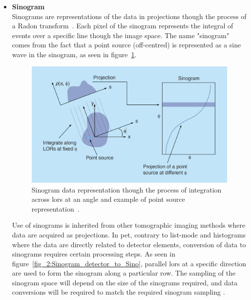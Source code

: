 \begin{itemize}
\item\textbf{Sinogram}\\
Sinograms are representations of the data in projections though the process of a Radon transform~\cite{radon1917}. Each pixel of the sinogram represents the integral of events over a specific line though the image space. The name "sinogram" comes from the fact that a point source (off-centred) is represented as a sine wave in the sinogram, as seen in figure~\ref{fig_2:Sinogram}.
%
\begin{figure} [h!]
\centering
\includegraphics[scale=0.24,angle=0]{2_Theory_Methods/figures/Sinogram_Alessio.png}
\caption{Sinogram data representation though the process of integration across \glspl{lor} at an angle and example of point source representation~\cite{Tong2010}.} 
\label{fig_2:Sinogram}
\end{figure} 
%
Use of sinograms is inherited from other tomographic imaging methods where data are acquired as projections. In \gls{pet}, contrary to list-mode and histograms where the data are directly related to detector elements, conversion of data to sinograms requires certain processing steps. As seen in figure~\ref{fig_2:Sinogram_detector_to_Sino}, parallel \glspl{lor} at a specific direction are used to form the sinogram along a particular row. The sampling of the sinogram space will depend on the size of the sinograms required, and data conversions will be required  to match the required sinogram sampling \cite{Fahey2002}. 
%
\begin{figure} [h!]
\centering

\end{figure}
\end{itemize}
